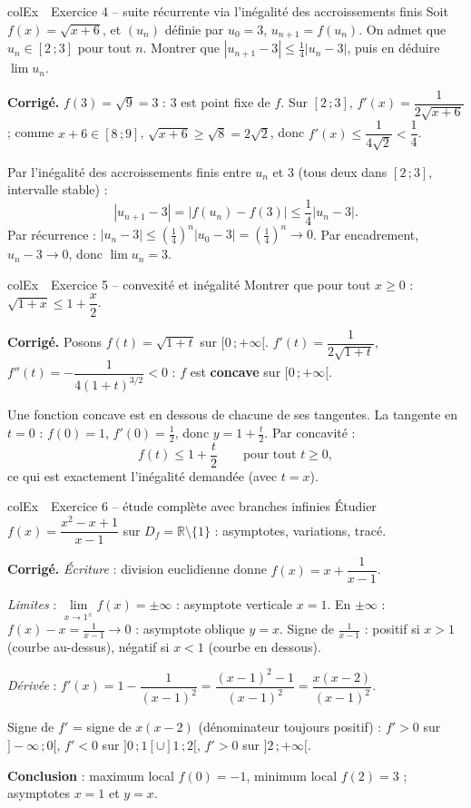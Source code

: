 \documentclass[11pt,a4paper]{article}
\newenvironment{exemple}[1][Exemple]
  {\begin{fiche}{colEx}{\ding{217}~~#1}}{\end{fiche}}
\begin{document}
\begin{exemple}[Exercice 4 -- suite récurrente via l'inégalité des accroissements finis]
Soit $f(x) = \sqrt{x + 6}$, et $(u_n)$ définie par $u_0 = 3$, $u_{n+1} = f(u_n)$. On admet que $u_n \in [2\,;3]$ pour tout $n$. Montrer que $|u_{n+1} - 3| \leq \frac{1}{4}|u_n - 3|$, puis en déduire $\lim u_n$.

\smallskip
\textbf{Corrigé.} $f(3) = \sqrt{9} = 3$ : $3$ est point fixe de $f$. Sur $[2\,;3]$, $f'(x) = \dfrac{1}{2\sqrt{x+6}}$ ; comme $x + 6 \in [8\,;9]$, $\sqrt{x+6} \geq \sqrt{8} = 2\sqrt{2}$, donc $f'(x) \leq \dfrac{1}{4\sqrt{2}} < \dfrac{1}{4}$.

\smallskip
Par l'inégalité des accroissements finis entre $u_n$ et $3$ (tous deux dans $[2\,;3]$, intervalle stable) :
\[
  |u_{n+1} - 3| = |f(u_n) - f(3)| \leq \frac{1}{4}|u_n - 3|.
\]
Par récurrence : $|u_n - 3| \leq \left(\frac{1}{4}\right)^n |u_0 - 3| = \left(\frac{1}{4}\right)^n \to 0$. Par encadrement, $u_n - 3 \to 0$, donc $\boxed{\lim u_n = 3}$.
\end{exemple}

\begin{exemple}[Exercice 5 -- convexité et inégalité]
Montrer que pour tout $x \geq 0$ : $\sqrt{1 + x} \leq 1 + \dfrac{x}{2}$.

\smallskip
\textbf{Corrigé.} Posons $f(t) = \sqrt{1+t}$ sur $[0\,;+\infty[$. $f'(t) = \dfrac{1}{2\sqrt{1+t}}$, $f''(t) = -\dfrac{1}{4(1+t)^{3/2}} < 0$ : $f$ est \textbf{concave} sur $[0\,;+\infty[$.

\smallskip
Une fonction concave est en dessous de chacune de ses tangentes. La tangente en $t = 0$ : $f(0) = 1$, $f'(0) = \frac{1}{2}$, donc $y = 1 + \frac{t}{2}$. Par concavité :
\[
  f(t) \leq 1 + \frac{t}{2} \qquad \text{pour tout } t \geq 0,
\]
ce qui est exactement l'inégalité demandée (avec $t = x$).
\end{exemple}

\begin{exemple}[Exercice 6 -- étude complète avec branches infinies]
Étudier $f(x) = \dfrac{x^2 - x + 1}{x - 1}$ sur $D_f = \mathbb{R} \setminus \{1\}$ : asymptotes, variations, tracé.

\smallskip
\textbf{Corrigé.} \emph{Écriture} : division euclidienne donne $f(x) = x + \dfrac{1}{x-1}$.

\smallskip
\emph{Limites} : $\lim\limits_{x \to 1^{\pm}} f(x) = \pm\infty$ : asymptote verticale $x = 1$. En $\pm\infty$ : $f(x) - x = \frac{1}{x-1} \to 0$ : asymptote oblique $y = x$. Signe de $\frac{1}{x-1}$ : positif si $x > 1$ (courbe au-dessus), négatif si $x < 1$ (courbe en dessous).

\smallskip
\emph{Dérivée} : $f'(x) = 1 - \dfrac{1}{(x-1)^2} = \dfrac{(x-1)^2 - 1}{(x-1)^2} = \dfrac{x(x-2)}{(x-1)^2}$.

\smallskip
Signe de $f'$ = signe de $x(x-2)$ (dénominateur toujours positif) : $f' > 0$ sur $]-\infty\,;0[$, $f' < 0$ sur $]0\,;1[\cup]1\,;2[$, $f' > 0$ sur $]2\,;+\infty[$.

\smallskip
\textbf{Conclusion} : maximum local $f(0) = -1$, minimum local $f(2) = 3$ ; asymptotes $x=1$ et $y=x$.
\end{exemple}
\end{document}
